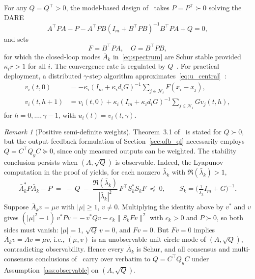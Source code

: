 \documentclass[12pt]{elsarticle}
\theoremstyle{remark}
\newtheorem{remark}{Remark}
\begin{document}
For any $Q = Q^\top > 0$, the model-based design of~\cite[Thm.~3.1]{cacace2024} takes $P = P^\top \succ 0$ solving the DARE
\begin{equation}
A^\top P A - P - A^\top PB(I_m + B^\top PB)^{-1}B^\top PA + Q = 0,
\label{eq:dare}
\end{equation}
and sets
\begin{equation}
F = B^\top P A, \quad G = B^\top P B,
\label{eq:FG_dare}
\end{equation}
for which the closed-loop modes $\bar{A}_k$ in~\eqref{eq:spectrum} are Schur stable provided $\kappa_i \bar{r} > 1$ for all $i$.
The convergence rate is regulated by $Q$~\cite[Remark~3.2]{cacace2024}. For practical deployment, a distributed $\gamma$-step algorithm approximates~\eqref{eq:u_central}~\cite{cacace2024}:
\begin{align}
v_i(t,0) &= -\kappa_i(I_m + \kappa_i d_i G)^{-1} \sum_{j \in \mathcal{N}_i} F(x_i - x_j), \label{eq:dist_init} \\
v_i(t,h{+}1) &= v_i(t,0) + \kappa_i(I_m + \kappa_i d_i G)^{-1} \sum_{j \in \mathcal{N}_i} Gv_j(t,h), \label{eq:dist_iter}
\end{align}
for $h = 0, \ldots, \gamma-1$, with $u_i(t) = v_i(t,\gamma)$.
\begin{remark}[Positive semi-definite weights]
\label{rem:psdQ}
Theorem~3.1 of~\cite{cacace2024} is stated for $Q \succ 0$, but the output feedback formulation of Section~\ref{sec:ofb_ql} necessarily employs $Q = C^\top Q_y C \succeq 0$, since only measured outputs can be weighted. The stability conclusion persists when $(A, \sqrt{Q})$ is observable. Indeed, the Lyapunov computation in the proof of \cite[Thm.~3.1]{cacace2024} yields, for each nonzero $\bar{\lambda}_k$ with $\Re(\bar{\lambda}_k) > 1$,
\begin{equation*}
\bar{A}_k^* P \bar{A}_k - P \;=\; -\,Q \;-\; \frac{\Re(\bar{\lambda}_k)}{|\bar{\lambda}_k|^2}\, F^\top S_k^* S_k F \;\preceq\; 0,
\qquad S_k = \Big(\tfrac{1}{\bar\lambda_k}I_m + G\Big)^{-1}.
\end{equation*}
Suppose $\bar{A}_k v = \mu v$ with $|\mu| \geq 1$, $v \neq 0$. Multiplying the identity above by $v^*$ and $v$ gives $(|\mu|^2 - 1)\,v^* P v = -\,v^* Q v - c_k \|S_k F v\|^2$ with $c_k > 0$ and $P \succ 0$, so both sides must vanish: $|\mu| = 1$, $\sqrt{Q}\,v = 0$, and $F v = 0$. But $Fv = 0$ implies $\bar{A}_k v = A v = \mu v$, i.e., $(\mu, v)$ is an unobservable unit-circle mode of $(A, \sqrt{Q})$, contradicting observability. Hence every $\bar{A}_k$ is Schur, and all consensus and multi-consensus conclusions of~\cite{cacace2024} carry over verbatim to $Q = C^\top Q_y C$ under Assumption~\ref{ass:observable} on $(A, \sqrt{Q})$.
\end{remark}
\end{document}
